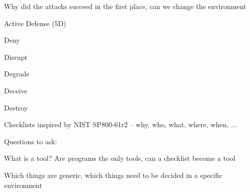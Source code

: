 \documentclass[Screen16to9,17pt]{foils}
\begin{document}
\begin{list2}
\item Why did the attacks succeed in the first place, can we change the environment
\end{list2}


Active Defense (5D)
\begin{list2}
\item Deny
\item Disrupt
\item Degrade
\item Deceive
\item Destroy
\end{list2}




\begin{list2}
\item Checklists inspired by NIST SP800-61r2 -- why, who, what, where, when, ...
\end{list2}



Questions to ask:
\begin{list2}
\item What is a tool? Are programs the only tools, can a checklist become a tool
\item Which things are generic, which things need to be decided in a specific environment
\end{list2}

\end{document}
